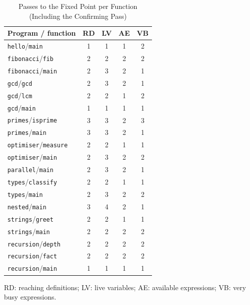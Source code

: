\documentclass[conference]{IEEEtran}
\newcommand{\code}[1]{\texttt{#1}}
\begin{document}
\begin{table}[!tbp]
\caption{Passes to the Fixed Point per Function (Including the Confirming Pass)}
\label{tab:rounds}
\centering
\footnotesize
\setlength{\tabcolsep}{4pt}
\begin{tabular*}{\columnwidth}{@{\extracolsep{\fill}}l c c c c@{}}
\toprule
Program / function & RD & LV & AE & VB \\
\midrule
\code{hello}/\code{main} & 1 & 1 & 1 & 2 \\
\code{fibonacci}/\code{fib} & 2 & 2 & 2 & 2 \\
\code{fibonacci}/\code{main} & 2 & 3 & 2 & 1 \\
\code{gcd}/\code{gcd} & 2 & 3 & 2 & 1 \\
\code{gcd}/\code{lcm} & 2 & 2 & 1 & 2 \\
\code{gcd}/\code{main} & 1 & 1 & 1 & 1 \\
\code{primes}/\code{isprime} & 3 & 3 & 2 & 3 \\
\code{primes}/\code{main} & 3 & 3 & 2 & 1 \\
\code{optimiser}/\code{measure} & 2 & 2 & 1 & 1 \\
\code{optimiser}/\code{main} & 2 & 3 & 2 & 2 \\
\code{parallel}/\code{main} & 2 & 3 & 2 & 1 \\
\code{types}/\code{classify} & 2 & 2 & 1 & 1 \\
\code{types}/\code{main} & 2 & 3 & 2 & 2 \\
\code{nested}/\code{main} & 3 & 4 & 2 & 1 \\
\code{strings}/\code{greet} & 2 & 2 & 1 & 1 \\
\code{strings}/\code{main} & 2 & 2 & 2 & 2 \\
\code{recursion}/\code{depth} & 2 & 2 & 2 & 2 \\
\code{recursion}/\code{fact} & 2 & 2 & 2 & 2 \\
\code{recursion}/\code{main} & 1 & 1 & 1 & 1 \\
\bottomrule
\end{tabular*}
\par\vspace{0pt}
\parbox{\columnwidth}{\scriptsize RD: reaching definitions; LV: live variables; AE: available expressions; VB: very busy expressions.}
\end{table}
\end{document}
